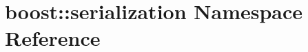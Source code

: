 \hypertarget{namespaceboost_1_1serialization}{\section{boost\-:\-:serialization Namespace Reference}
\label{namespaceboost_1_1serialization}
}
